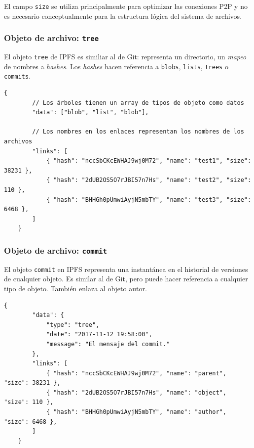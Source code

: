 \documentclass[12pt]{article} %
\begin{document}
El campo \texttt{size} se utiliza principalmente para optimizar las conexiones P2P y no es necesario conceptualmente para la estructura lógica del sistema de archivos.


\subsubsection{Objeto de archivo: \texttt{tree}} %
\label{ssub:objeto_de_archivo_tree}

El objeto \texttt{tree} de IPFS es similiar al de Git: representa un directorio, un \textit{mapeo} de nombres a \textit{hashes}. Los \textit{hashes} hacen referencia a \texttt{blobs}, \texttt{lists}, \texttt{trees} o \texttt{commits}.

\begin{lstlisting}[caption={Estructura JSON de un \texttt{tree}.}]
	{
		// Los árboles tienen un array de tipos de objeto como datos
		"data": ["blob", "list", "blob"],

		// Los nombres en los enlaces representan los nombres de los archivos
		"links": [
			{ "hash": "nccSbCKcEWHAJ9wj0M72", "name": "test1", "size": 38231 },
			{ "hash": "2dUB2OS5O7rJBI57n7Hs", "name": "test2", "size": 110 },
			{ "hash": "BHHGh0pUmwiAyjN5mbTY", "name": "test3", "size": 6468 },
		]
	}
\end{lstlisting}


\subsubsection{Objeto de archivo: \texttt{commit}} %
\label{ssub:objeto_de_archivo_commit}

El objeto \texttt{commit} en IPFS representa una instantánea en el historial de versiones de cualquier objeto. Es similar al de Git, pero puede hacer referencia a cualquier tipo de objeto. También enlaza al objeto autor.

\begin{lstlisting}[caption={Estructura JSON de un \texttt{commit}.}]
	{
		"data": {
			"type": "tree",
			"date": "2017-11-12 19:58:00",
			"message": "El mensaje del commit."
		},
		"links": [
			{ "hash": "nccSbCKcEWHAJ9wj0M72", "name": "parent", "size": 38231 },
			{ "hash": "2dUB2OS5O7rJBI57n7Hs", "name": "object", "size": 110 },
			{ "hash": "BHHGh0pUmwiAyjN5mbTY", "name": "author", "size": 6468 },
		]
	}
\end{lstlisting}
\end{document}
